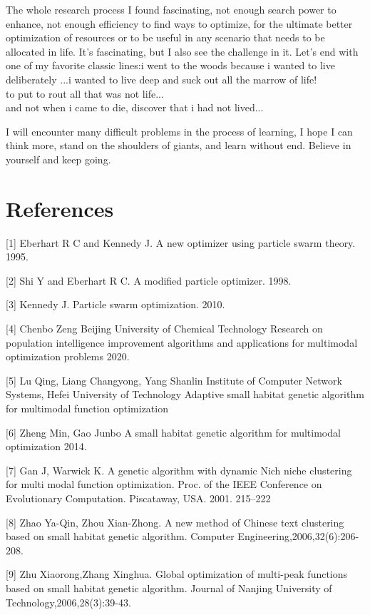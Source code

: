 \documentclass[twocolumn]{article}
\begin{document}
The whole research process I found fascinating, not enough search power
to enhance, not enough efficiency to find ways to optimize, for the
ultimate better optimization of resources or to be useful in any
scenario that needs to be allocated in life. It's fascinating, but I
also see the challenge in it. Let's end with one of my favorite classic
lines:i went to the woods because i wanted to live deliberately ...i
wanted to live deep and suck out all the marrow of life!\\
to put to rout all that was not life...\\
and not when i came to die, discover that i had not lived...

I will encounter many difficult problems in the process of learning, I
hope I can think more, stand on the shoulders of giants, and learn
without end. Believe in yourself and keep going.
\newpage
\section{References}\label{references}


{[}1{]} Eberhart R C and Kennedy J. A new optimizer using particle swarm
theory. 1995.

{[}2{]} Shi Y and Eberhart R C. A modified particle optimizer. 1998.

{[}3{]} Kennedy J. Particle swarm optimization. 2010.

{[}4{]} Chenbo Zeng Beijing University of Chemical Technology Research
on population intelligence improvement algorithms and applications for
multimodal optimization problems 2020.

{[}5{]} Lu Qing, Liang Changyong, Yang Shanlin Institute of Computer
Network Systems, Hefei University of Technology Adaptive small habitat
genetic algorithm for multimodal function optimization

{[}6{]} Zheng Min, Gao Junbo A small habitat genetic algorithm for
multimodal optimization 2014.

{[}7{]} Gan J, Warwick K. A genetic algorithm with dynamic Nich niche
clustering for multi modal function optimization. Proc. of the IEEE
Conference on Evolutionary Computation. Piscataway, USA. 2001. 215--222

{[}8{]} Zhao Ya-Qin, Zhou Xian-Zhong. A new method of Chinese text
clustering based on small habitat genetic algorithm. Computer
Engineering,2006,32(6):206-208.

{[}9{]} Zhu Xiaorong,Zhang Xinghua. Global optimization of multi-peak
functions based on small habitat genetic algorithm. Journal of Nanjing
University of Technology,2006,28(3):39-43.
\end{document}
